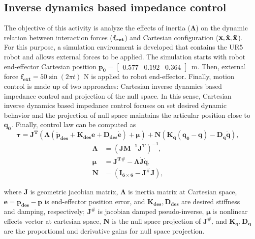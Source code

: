 \graphicspath{{images/act_2.3/}}
\subsection{Inverse dynamics based impedance control}
The objective of this activity is analyze the effects of inertia ($\boldsymbol{\Lambda}$) on the dynamic relation between interaction forces ($\mathbf{f_{ext}}$) and Cartesian configuration ($\mathbf{x, \dot{x}, \ddot{x}}$). For this purpose, a simulation environment is developed that contains the UR5 robot and allows external forces to be applied. The simulation starts with robot end-effector Cartesian position $\mathbf{p_0}=\begin{bmatrix}  0.577 &   0.192 &   0.364 \end{bmatrix}$~m. Then, external force $\mathbf{f_{ext}}= 50\sin{(2\pi t)}$ N is applied to robot end-effector. Finally, motion control is made up of two approaches: Cartesian inverse dynamics based impedance control and projection of the null space. In this sense, Cartesian inverse dynamics based impedance control focuses on set desired dynamic behavior and the projection of null space maintains the articular position close to $\mathbf{q_0}$. Finally, control law can be computed as 
\begin{equation}
	\boldsymbol{\tau}
	= \mathbf{J^T} (\boldsymbol{\Lambda}( \mathbf{\ddot{p}_{des}} + \mathbf{K_{des} e} + \mathbf{D_{des}\dot{e}}) + \boldsymbol{\mu})+ \mathbf{N} \left(\mathbf{K_q(q_0-q) - D_q \dot{q}} \right),
	\label{eq:cartesian_idyn_N}
\end{equation} 
\begin{align*}
	\boldsymbol{\Lambda} &= (\mathbf{J M^{-1} J^{T}})^{-1}, \\
	\boldsymbol{\mu} &= \mathbf{J^{T\#}} - \boldsymbol{\Lambda}\mathbf{\dot{J}\dot{q}}, \\
	\mathbf{N} &=(\mathbf{I_{6 \times 6}} - \mathbf{J^{\#} J} ),
\end{align*}

\noindent where $\mathbf{J}$ is geometric jacobian matrix, $\boldsymbol{\Lambda}$ is inertia matrix at Cartesian space, $\mathbf{e}=\mathbf{p_{des} - p}$ is end-effector position error, and $\mathbf{K_{des}, D_{des}}$ are desired stiffness and damping, respectively; $\mathbf{J^{\#}}$ is jacobian damped pseudo-inverse, $\boldsymbol{\mu}$ is nonlinear effects vector at cartesian space, $\mathbf{N}$ is the null space projection of $\mathbf{J^{\#}}$, and $\mathbf{K_q, D_q}$ are the proportional and derivative gains for null space projection. 

